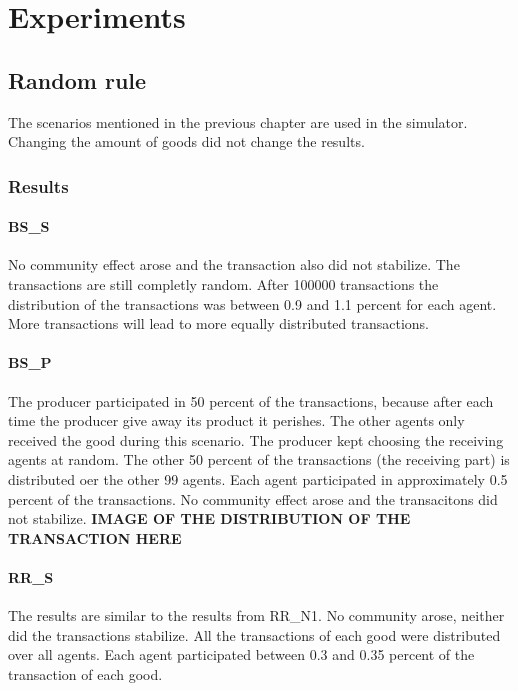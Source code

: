\documentclass[twoside,openright]{uva-bachelor-thesis}
\begin{document}
\chapter{Experiments}

\section{Random rule}
The scenarios mentioned in the previous chapter are used in the simulator. Changing the amount of goods did not change the results.
\subsection{Results}

\subsubsection{BS\_S}
No community effect arose and the transaction also did not stabilize. The transactions are still completly random. After 100000 transactions the distribution of the transactions was between 0.9 and 1.1 percent for each agent. More transactions will lead to more equally distributed transactions.

\subsubsection{BS\_P}
The producer participated in 50 percent of the transactions, because after each time the producer give away its product it perishes. The other agents only received the good during this scenario. The producer kept choosing the receiving agents at random. The other 50 percent of the transactions (the receiving part) is distributed oer the other 99 agents. Each agent participated in approximately 0.5 percent of the transactions. No community effect arose and the transacitons did not stabilize.
\textbf{IMAGE OF THE DISTRIBUTION OF THE TRANSACTION HERE}

\subsubsection{RR\_S}
The results are similar to the results from RR\_N1. No community arose, neither did the transactions stabilize. All the transactions of each good were distributed over all agents. Each agent participated between 0.3 and 0.35 percent of the transaction of each good.
\end{document}

